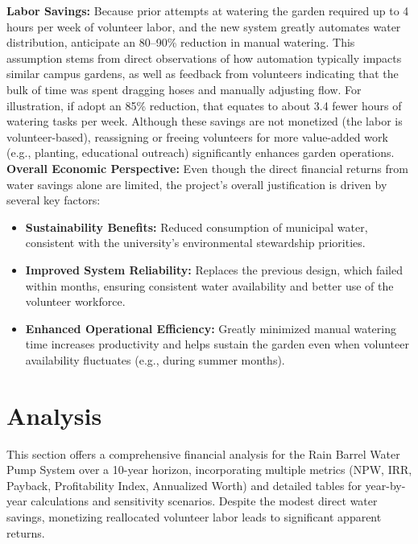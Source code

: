 \documentclass[12pt]{article}
\begin{document}
\noindent\textbf{Labor Savings:}  
Because prior attempts at watering the garden required up to 4 hours per week of volunteer labor, and the new system greatly automates water distribution, anticipate an 80--90\% reduction in manual watering. This assumption stems from direct observations of how automation typically impacts similar campus gardens, as well as feedback from volunteers indicating that the bulk of time was spent dragging hoses and manually adjusting flow. For illustration, if adopt an 85\% reduction, that equates to about 3.4 fewer hours of watering tasks per week. Although these savings are not monetized (the labor is volunteer-based), reassigning or freeing volunteers for more value-added work (e.g., planting, educational outreach) significantly enhances garden operations.
\newline\newline
\textbf{Overall Economic Perspective:}  
Even though the direct financial returns from water savings alone are limited, the project’s overall justification is driven by several key factors:
\begin{itemize}
    \item \textbf{Sustainability Benefits:} Reduced consumption of municipal water, consistent with the university’s environmental stewardship priorities.
    \item \textbf{Improved System Reliability:} Replaces the previous design, which failed within months, ensuring consistent water availability and better use of the volunteer workforce.
    \item \textbf{Enhanced Operational Efficiency:} Greatly minimized manual watering time increases productivity and helps sustain the garden even when volunteer availability fluctuates (e.g., during summer months).
\end{itemize}






\newpage
\section*{Analysis}
\vspace{-0.5em}

This section offers a comprehensive financial analysis for the Rain Barrel Water Pump System over a 10-year horizon, incorporating multiple metrics (NPW, IRR, Payback, Profitability Index, Annualized Worth) and detailed tables for year-by-year calculations and sensitivity scenarios. Despite the modest direct water savings, monetizing reallocated volunteer labor leads to significant apparent returns.
\end{document}
